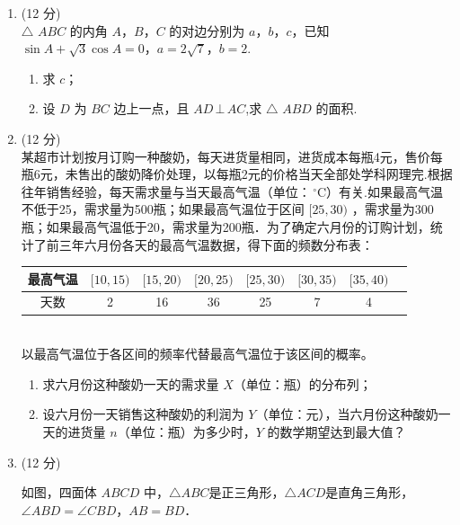\documentclass[11pt,space]{ctexart}
\begin{document}
\begin{enumerate}[itemsep=-0.3em,topsep=0pt,resume]%
	\item (12 分)\\
	$\triangle$ $ABC$ 的内角 $A$，$B$，$C$ 的对边分别为 $a$，$b$，$c$，已知 $\sin A+\sqrt{3}\cos A=0$，$a=2\sqrt{7}$，$b=2$.
	\begin{enumerate}[itemsep=-0.3em,label={(\arabic*)},topsep=0pt,labelsep=.5em,leftmargin=1.7em]
		\item 求 $c$；
		\item 设 $D$ 为 $BC$ 边上一点，且 $AD\,\bot \,AC$,求 $\triangle$ $ABD$ 的面积.
	\end{enumerate}
	\item (12 分)\\
	某超市计划按月订购一种酸奶，每天进货量相同，进货成本每瓶4元，售价每瓶6元，未售出的酸奶降价处理，以每瓶2元的价格当天全部处学科网理完.根据往年销售经验，每天需求量与当天最高气温（单位：$\,^{\circ}\mathrm{C}$）有关.如果最高气温不低于25，需求量为500瓶；如果最高气温位于区间 $[25,30)$ ，需求量为300瓶；如果最高气温低于20，需求量为200瓶．为了确定六月份的订购计划，统计了前三年六月份各天的最高气温数据，得下面的频数分布表：\\[-2em]
	\begin{table}[htbp]
		\centering
		\begin{tabular}{|c|c|c|c|c|c|c|c|}\hline
			最高气温 & $[10,15)$& $[15,20)$ & $[20,25)$ & $[25,30)$ & $[30,35)$ & $[35,40)$\\\hline
			天数     & 2        & 16       &36        &25        &7         &4         \\\hline
		\end{tabular}
	\end{table}\\[-1em]
	以最高气温位于各区间的频率代替最高气温位于该区间的概率。
	\begin{enumerate}[itemsep=-0.3em,label={(\arabic*)},topsep=0pt,labelsep=.5em,leftmargin=1.7em]
		\item 求六月份这种酸奶一天的需求量 $X$（单位：瓶）的分布列；
		\item 设六月份一天销售这种酸奶的利润为 $Y$（单位：元），当六月份这种酸奶一天的进货量 $n$（单位：瓶）为多少时，$Y$ 的数学期望达到最大值？
	\end{enumerate}
	\item (12 分)\\[0.5em] \begin{minipage}[h][20ex][t]{.23\textwidth}
		如图，四面体 $ABCD$ 中，$\triangle ABC$是正三角形，$\triangle ACD$是直角三角形，$\angle ABD=\angle CBD$，$AB=BD$．

\end{minipage}
\end{enumerate}
\end{document}
